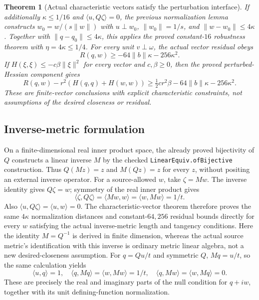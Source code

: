 \documentclass[11pt]{article}
\newtheorem{theorem}{Theorem}[section]
\theoremstyle{definition}
\theoremstyle{remark}
\numberwithin{equation}{section}
\begin{document}
\begin{theorem}[Actual characteristic vectors satisfy the perturbation interface]
If additionally $\kappa\le1/16$ and
$\langle u,Q\zeta\rangle=0$, the previous normalization lemma constructs
$w_0=w/(s\|w\|)$ with
$u\perp w_0$, $\|w_0\|=1/s$, and $\|w-w_0\|\le4\kappa$.
Together with $\|q-q_0\|\le4\kappa$, this applies the proved
constant-$16$ robustness theorem with $\eta=4\kappa\le1/4$.
For every unit $v\perp\omega$, the actual vector residual obeys
\[
 R(q,w)\ge-64\|b\|\kappa-256\kappa^2.
\]
If $H(\xi,\xi)\le-c\beta\|\xi\|^2$ for every vector and $c,\beta\ge0$,
then the proved perturbed-Hessian component gives
\[
 R(q,w)-r^2(H(q,q)+H(w,w))
 \ge\tfrac12 c r^2\beta-64\|b\|\kappa-256\kappa^2.
\]
These are finite-vector conclusions with explicit characteristic constraints,
not assumptions of the desired closeness or residual.
\end{theorem}


\subsection{Inverse-metric formulation}
On a finite-dimensional real inner product space, the already proved
bijectivity of $Q$ constructs a linear inverse $M$ by the checked
\texttt{LinearEquiv.ofBijective} construction. Thus $Q(Mz)=z$ and
$M(Qz)=z$ for every $z$, without positing an external inverse operator.
For a source-allowed $w$, take $\zeta=Mw$. The inverse identity gives
$Q\zeta=w$; symmetry of the real inner product gives
\[
 \langle\zeta,Q\zeta\rangle
 =\langle Mw,w\rangle=\langle w,Mw\rangle=1/t.
\]
Also $\langle u,Q\zeta\rangle=\langle u,w\rangle=0$.
The characteristic-vector theorem therefore proves the same $4\kappa$
normalization distances and constant-$64,256$ residual bounds directly
for every $w$ satisfying the actual inverse-metric length and tangency
conditions. Here the identity $M=Q^{-1}$ is derived in finite dimension,
whereas the actual source metric's identification with this inverse is
ordinary metric linear algebra, not a new desired-closeness assumption.
For $q=Qu/t$ and symmetric $Q$, $Mq=u/t$, so the same calculation yields
\[
 \langle u,q\rangle=1,\quad
 \langle q,Mq\rangle=\langle w,Mw\rangle=1/t,
 \quad\langle q,Mw\rangle=\langle w,Mq\rangle=0.
\]
These are precisely the real and imaginary parts of the null condition
for $q+iw$, together with its unit defining-function normalization.
\end{document}
